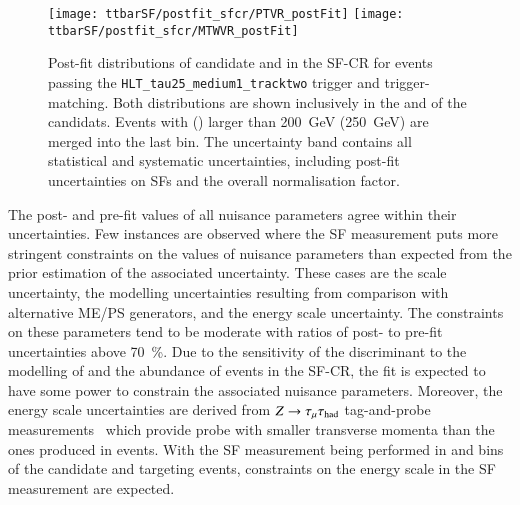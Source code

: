\begin{figure}[htbp]
  \centering

  \texttt{[image: ttbarSF/postfit\_sfcr/PTVR\_postFit]}
  \texttt{[image: ttbarSF/postfit\_sfcr/MTWVR\_postFit]}

  \caption{Post-fit distributions of \tauhadvis candidate \pT and \mTW in the
    SF-CR for events passing the \texttt{HLT\_tau25\_medium1\_tracktwo} trigger
    and trigger-matching. Both distributions are shown inclusively in the
    \Ntracks and \pT of the \tauhadvis candidats. Events with \tauhadvis \pT
    (\mTW) larger than \SI{200}{\GeV} (\SI{250}{\GeV}) are merged into the last
    bin. The uncertainty band contains all statistical and systematic
    uncertainties, including post-fit uncertainties on \faketauhadvis SFs and
    the overall \ttbar normalisation factor.}%
  \label{fig:ttbarSF_postfit_ptmtw}
\end{figure}

The post- and pre-fit values of all nuisance parameters agree within their
uncertainties. Few instances are observed where the SF measurement puts more
stringent constraints on the values of nuisance parameters than expected from
the prior estimation of the associated uncertainty. These cases are the
\pTmissAbs scale uncertainty, the \ttbar modelling uncertainties resulting from
comparison with alternative ME/PS generators, and the \tauhadvis energy scale
uncertainty. The constraints on these parameters tend to be moderate with ratios
of post- to pre-fit uncertainties above \SI{70}{\percent}. Due to the
sensitivity of the \mTW discriminant to the modelling of \pTmissAbs and the
abundance of \ttbar events in the SF-CR, the fit is expected to have some power
to constrain the associated nuisance parameters. Moreover, the \tauhadvis energy
scale uncertainties are derived from $Z \rightarrow \tau_{\mu} \tau_{\text{had}}$ tag-and-probe
measurements~\cite{ATLAS-CONF-2017-029} which provide probe \tauhadvis with
smaller transverse momenta than the ones produced in \ttbar events. With the SF
measurement being performed in \Ntracks and \pT bins of the \tauhadvis candidate
and targeting \ttbar events, constraints on the \tauhadvis energy scale in the
SF measurement are expected.


